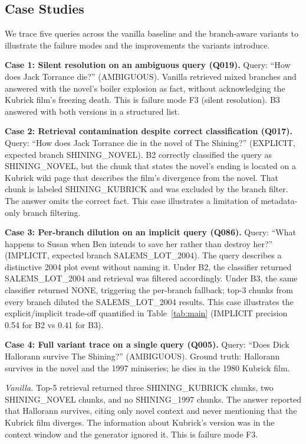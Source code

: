 \documentclass[conference]{IEEEtran}
\begin{document}
\subsection{Case Studies}
\label{sec:casestudies}

We trace five queries across the vanilla baseline and the branch-aware variants to illustrate the failure modes and the improvements the variants introduce.

\textbf{Case 1: Silent resolution on an ambiguous query (Q019).} Query: ``How does Jack Torrance die?'' (AMBIGUOUS). Vanilla retrieved mixed branches and answered with the novel's boiler explosion as fact, without acknowledging the Kubrick film's freezing death. This is failure mode F3 (silent resolution). B3 answered with both versions in a structured list.


\textbf{Case 2: Retrieval contamination despite correct classification (Q017).} Query: ``How does Jack Torrance die in the novel of The Shining?'' (EXPLICIT, expected branch SHINING\_NOVEL). B2 correctly classified the query as SHINING\_NOVEL, but the chunk that states the novel's ending is located on a Kubrick wiki page that describes the film's divergence from the novel. That chunk is labeled SHINING\_KUBRICK and was excluded by the branch filter. The answer omits the correct fact. This case illustrates a limitation of metadata-only branch filtering.

\textbf{Case 3: Per-branch dilution on an implicit query (Q086).} Query: ``What happens to Susan when Ben intends to save her rather than destroy her?'' (IMPLICIT, expected branch SALEMS\_LOT\_2004). The query describes a distinctive 2004 plot event without naming it. Under B2, the classifier returned SALEMS\_LOT\_2004 and retrieval was filtered accordingly. Under B3, the same classifier returned NONE, triggering the per-branch fallback; top-3 chunks from every branch diluted the SALEMS\_LOT\_2004 results. This case illustrates the explicit/implicit trade-off quantified in Table~\ref{tab:main} (IMPLICIT precision 0.54 for B2 vs 0.41 for B3).

\textbf{Case 4: Full variant trace on a single query (Q005).} Query: ``Does Dick Hallorann survive The Shining?'' (AMBIGUOUS). Ground truth: Hallorann survives in the novel and the 1997 miniseries; he dies in the 1980 Kubrick film.

\emph{Vanilla.} Top-5 retrieval returned three SHINING\_KUBRICK chunks, two SHINING\_NOVEL chunks, and no SHINING\_1997 chunks. The answer reported that Hallorann survives, citing only novel context and never mentioning that the Kubrick film diverges. The information about Kubrick's version was in the context window and the generator ignored it. This is failure mode F3.
\end{document}
